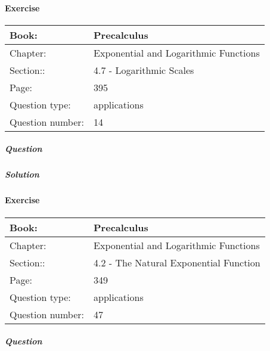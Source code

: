 \documentclass{article}
\begin{document}
        
            \newpage
            \paragraph{Exercise}\par
            \noindent
            \begin{tabularx}{1\textwidth}{
                    p{}
                    p{}
                }
                \toprule
                Book: & Precalculus
                \\
                \midrule
                Chapter: & Exponential and Logarithmic Functions
                \\
                \midrule
                Section:: & 4.7 - Logarithmic Scales
                \\
                \midrule
                Page: & 395
                \\
                \midrule
                Question type: & applications
                \\
                \midrule
                Question number: & 14
                \\
                \bottomrule
            \end{tabularx}
            \subparagraph{Question}
            
            \subparagraph{Solution}
            
            
            \newpage
            \paragraph{Exercise}\par
            \noindent
            \begin{tabularx}{1\textwidth}{
                    p{}
                    p{}
                }
                \toprule
                Book: & Precalculus
                \\
                \midrule
                Chapter: & Exponential and Logarithmic Functions
                \\
                \midrule
                Section:: & 4.2 - The Natural Exponential Function
                \\
                \midrule
                Page: & 349
                \\
                \midrule
                Question type: & applications
                \\
                \midrule
                Question number: & 47
                \\
                \bottomrule
            \end{tabularx}
            \subparagraph{Question}
            
\end{document}
